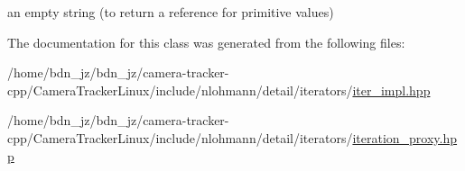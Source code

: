 an empty string (to return a reference for primitive values) 



The documentation for this class was generated from the following files\+:\begin{DoxyCompactItemize}
\item 
/home/bdn\+\_\+jz/bdn\+\_\+jz/camera-\/tracker-\/cpp/\+Camera\+Tracker\+Linux/include/nlohmann/detail/iterators/\hyperlink{iter__impl_8hpp}{iter\+\_\+impl.\+hpp}\item 
/home/bdn\+\_\+jz/bdn\+\_\+jz/camera-\/tracker-\/cpp/\+Camera\+Tracker\+Linux/include/nlohmann/detail/iterators/\hyperlink{iteration__proxy_8hpp}{iteration\+\_\+proxy.\+hpp}\end{DoxyCompactItemize}
